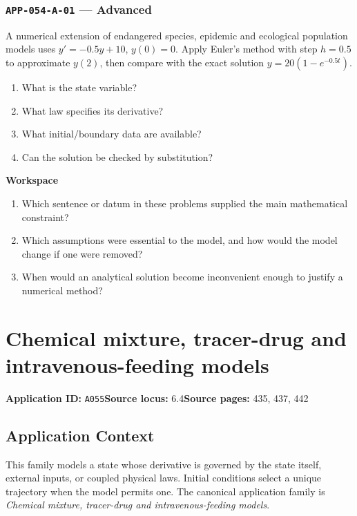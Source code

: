 \documentclass[11pt]{book}
\newcommand{\pid}[1]{\texttt{#1}}
\newcommand{\workspace}{\par\vspace{0.7in}\hrulefill\par\vspace{0.55in}\hrulefill\par}
\begin{document}
\subsection*{\pid{APP-054-A-01} — Advanced}
\begin{problembox}
A numerical extension of endangered species, epidemic and ecological population models uses $y'=-0.5y+10$, $y(0)=0$. Apply Euler's method with step $h=0.5$ to approximate $y(2)$, then compare with the exact solution $y=20(1-e^{-0.5t})$.
\end{problembox}
\begin{promptbox}\begin{enumerate}
\item What is the state variable?
\item What law specifies its derivative?
\item What initial/boundary data are available?
\item Can the solution be checked by substitution?
\end{enumerate}\end{promptbox}
\textbf{Workspace}\workspace
\begin{reflectionbox}\begin{enumerate}
\item Which sentence or datum in these problems supplied the main mathematical constraint?
\item Which assumptions were essential to the model, and how would the model change if one were removed?
\item When would an analytical solution become inconvenient enough to justify a numerical method?
\end{enumerate}\end{reflectionbox}
\chapter{Chemical mixture, tracer-drug and intravenous-feeding models}\label{app:A055}
\textbf{Application ID:} \pid{A055}\quad \textbf{Source locus:} 6.4\quad \textbf{Source pages:} 435, 437, 442
\section*{Application Context}
This family models a state whose derivative is governed by the state itself, external inputs, or coupled physical laws. Initial conditions select a unique trajectory when the model permits one. The canonical application family is \emph{Chemical mixture, tracer-drug and intravenous-feeding models}.
\end{document}
